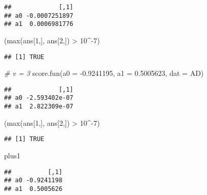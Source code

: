 \documentclass[
]{article}
\newenvironment{Shaded}{\begin{snugshade}}{\end{snugshade}}
\newcommand{\AttributeTok}[1]{\textcolor[rgb]{0.77,0.63,0.00}{#1}}
\newcommand{\CommentTok}[1]{\textcolor[rgb]{0.56,0.35,0.01}{\textit{#1}}}
\newcommand{\DecValTok}[1]{\textcolor[rgb]{0.00,0.00,0.81}{#1}}
\newcommand{\FloatTok}[1]{\textcolor[rgb]{0.00,0.00,0.81}{#1}}
\newcommand{\FunctionTok}[1]{\textcolor[rgb]{0.00,0.00,0.00}{#1}}
\newcommand{\NormalTok}[1]{#1}
\newcommand{\SpecialCharTok}[1]{\textcolor[rgb]{0.00,0.00,0.00}{#1}}
\begin{document}
\begin{verbatim}
##             [,1]
## a0 -0.0007251897
## a1  0.0006981776
\end{verbatim}

\begin{Shaded}
\begin{Highlighting}[]
\NormalTok{(}\FunctionTok{max}\NormalTok{(ans[}\DecValTok{1}\NormalTok{,], ans[}\DecValTok{2}\NormalTok{,]) }\SpecialCharTok{\textgreater{}} \DecValTok{10}\SpecialCharTok{\^{}{-}}\DecValTok{7}\NormalTok{)}
\end{Highlighting}
\end{Shaded}

\begin{verbatim}
## [1] TRUE
\end{verbatim}

\begin{Shaded}
\begin{Highlighting}[]
\CommentTok{\# v = 3}
\FunctionTok{score.fun}\NormalTok{(}\AttributeTok{a0 =} \SpecialCharTok{{-}}\FloatTok{0.9241195}\NormalTok{, }\AttributeTok{a1 =} \FloatTok{0.5005623}\NormalTok{, }\AttributeTok{dat =}\NormalTok{ AD)}
\end{Highlighting}
\end{Shaded}

\begin{verbatim}
##             [,1]
## a0 -2.593402e-07
## a1  2.822309e-07
\end{verbatim}

\begin{Shaded}
\begin{Highlighting}[]
\NormalTok{(}\FunctionTok{max}\NormalTok{(ans[}\DecValTok{1}\NormalTok{,], ans[}\DecValTok{2}\NormalTok{,]) }\SpecialCharTok{\textgreater{}} \DecValTok{10}\SpecialCharTok{\^{}{-}}\DecValTok{7}\NormalTok{)}
\end{Highlighting}
\end{Shaded}

\begin{verbatim}
## [1] TRUE
\end{verbatim}

\begin{Shaded}
\begin{Highlighting}[]
\NormalTok{plus1}
\end{Highlighting}
\end{Shaded}

\begin{verbatim}
##          [,1]
## a0 -0.9241198
## a1  0.5005626
\end{verbatim}
\end{document}

